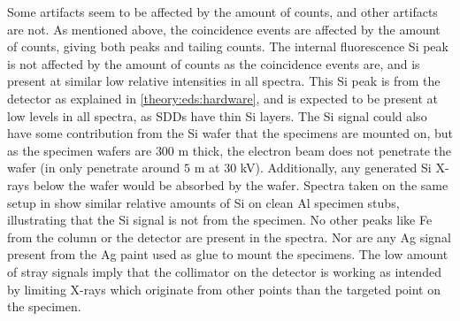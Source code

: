 Some artifacts seem to be affected by the amount of counts, and other artifacts are not.
As mentioned above, the coincidence events are affected by the amount of counts, giving both peaks and tailing counts.
The internal fluorescence Si peak is not affected by the amount of counts as the coincidence events are, and is present at similar low relative intensities in all spectra.
This Si peak is from the detector as explained in \cref{theory:eds:hardware}, and is expected to be present at low levels in all spectra, as SDDs have thin Si layers.
The Si signal could also have some contribution from the Si wafer that the specimens are mounted on, but as the specimen wafers are $300$ \textmu m thick, the electron beam does not penetrate the wafer (in only penetrate around $5$ \textmu m at $30$ kV).
Additionally, any generated Si X-rays below the wafer would be absorbed by the wafer.
Spectra taken on the same setup in \cite{project_report} show similar relative amounts of Si on clean Al specimen stubs, illustrating that the Si signal is not from the specimen.
No other peaks like Fe from the column or the detector are present in the spectra.
Nor are any Ag signal present from the Ag paint used as glue to mount the specimens.
The low amount of stray signals imply that the collimator on the detector is working as intended by limiting X-rays which originate from other points than the targeted point on the specimen.


